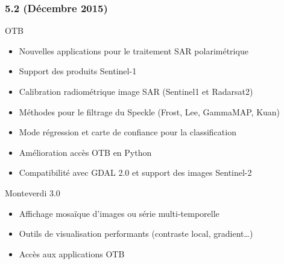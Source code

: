 \documentclass[8pt]{beamer}
\begin{document}
\begin{frame}
\frametitle{5.2 (Décembre 2015)}
\begin{block}{OTB}
\begin{itemize}
\item Nouvelles applications pour le traitement SAR polarimétrique
\item Support des produits Sentinel-1
\item Calibration radiométrique image SAR (Sentinel1 et Radarsat2)
\item Méthodes pour le filtrage du Speckle (Frost, Lee, GammaMAP, Kuan)
\item Mode régression et carte de confiance pour la classification
\item Amélioration accès OTB en Python
\item Compatibilité avec GDAL 2.0 et support des images Sentinel-2
\end{itemize}
\end{block}

\begin{block}{Monteverdi 3.0}
\begin{itemize}
\item Affichage mosaïque d'images ou série multi-temporelle
\item Outils de visualisation performants (contraste local, gradient\ldots)
\item Accès aux applications OTB
\end{itemize}
\end{block}
\end{frame}
\end{document}
